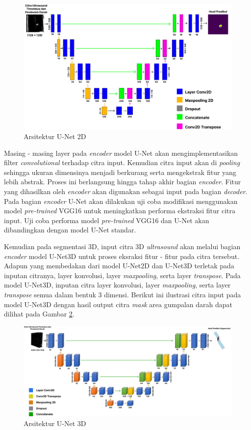 {\begin{figure}[htbp]
	\centering
	\includegraphics[scale= 0.2]{bab3/unet_2d.png}
	\caption{Arsitektur U-Net 2D}
	\label{fig:modelU-Net2D}
\end{figure}

Masing - masing layer pada \textit{encoder} model U-Net akan mengimplementasikan filter \textit{convolutional} terhadap citra input. Kemudian citra input akan di \textit{pooling} sehingga ukuran dimensinya menjadi berkurang serta mengekstrak fitur yang lebih abstrak. Proses ini berlangsung hingga tahap akhir bagian \textit{encoder}. Fitur yang dihasilkan oleh \textit{encoder} akan digunakan sebagai input pada bagian \textit{decoder}. Pada bagian \textit{encoder} U-Net akan dilakukan uji coba modifikasi menggunakan model \textit{pre-trained} VGG16 untuk meningkatkan performa ekstraksi fitur citra input. Uji coba performa model \textit{pre-trained} VGG16 dan U-Net akan dibandingkan dengan model U-Net standar.

Kemudian pada segmentasi 3D, input citra 3D \textit{ultrasound} akan melalui bagian \textit{encoder} model U-Net3D untuk proses eksraksi fitur - fitur pada citra tersebut. Adapun yang membedakan dari model U-Net2D dan U-Net3D terletak pada inputan citranya, layer konvolusi, layer \textit{maxpooling}, serta layer \textit{transpose}. Pada model U-Net3D, inputan citra layer konvolusi, layer \textit{maxpooling}, serta layer \textit{transpose} semua dalam bentuk 3 dimensi. Berikut ini ilustrasi citra input pada model U-Net3D dengan hasil output citra \textit{mask} area gumpalan darah dapat dilihat pada Gambar \ref{fig:model_U-Net3D}.  

\begin{figure}[htbp]
	\centering
	\includegraphics[scale= 0.2]{bab3/Unet 3d.png}
	\caption{Arsitektur U-Net 3D}
	\label{fig:model_U-Net3D}
\end{figure}


}
